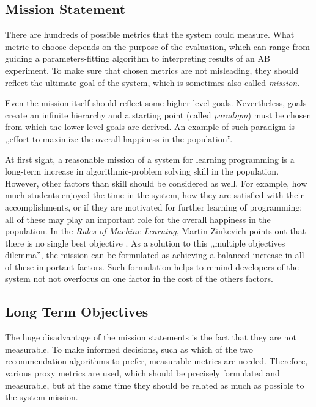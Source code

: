 \subsection{Mission Statement}
\label{sec:mission}

There are hundreds of possible metrics that the system could measure.
What metric to choose depends on the purpose of the evaluation,
  which can range from guiding a parameters-fitting algorithm
  to interpreting results of an AB experiment.
To make sure that chosen metrics are not misleading,
  they should reflect the ultimate goal of the system,
  which is sometimes also called \emph{mission}.

Even the mission itself should reflect some higher-level goals.
Nevertheless, goals create an infinite hierarchy
  and a starting point (called \emph{paradigm}) must be chosen from which
  the lower-level goals are derived.
An example of such paradigm is
  ,,effort to maximize the overall happiness in the population''.

At first sight, a reasonable mission of a system for learning programming
  is a long-term increase in algorithmic-problem solving skill in the population.
However, other factors than skill should be considered as well.
For example, how much students enjoyed the time in the system,
  how they are satisfied with their accomplishments,
  or if they are motivated for further learning of programming;
  all of these may play an important role for the overall happiness in the population.
In the \emph{Rules of Machine Learning}, Martin Zinkevich
  points out that there is no single best objective \cite[][Rule \#39]{google-ml-rules}.
As a solution to this ,,multiple objectives dilemma'',
  the mission can be formulated as achieving a balanced increase in all
  of these important factors.
Such formulation helps to remind developers of the system not not overfocus on one factor
  in the cost of the others factors.


\subsection{Long Term Objectives}
\label{sec:long-term-objectives}

The huge disadvantage of the mission statements
  is the fact that they are not measurable.
To make informed decisions,
  such as which of the two recommendation algorithms to prefer,
  measurable metrics are needed.
Therefore, various proxy metrics are used,
  which should be precisely formulated and measurable,
  but at the same time they should be related as much as possible to the system mission.

